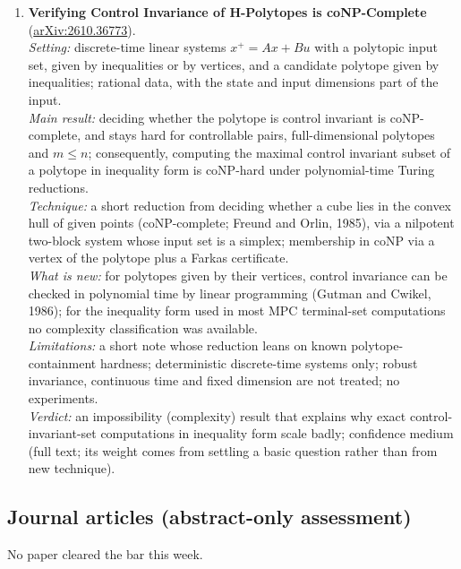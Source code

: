\documentclass[11pt,a4paper]{article}
\begin{document}
\begin{enumerate}[leftmargin=*]
  \emph{Verdict:} a fundamental limit of certainty-equivalent control when actions shape the information, with an explicit regime where its loss grows linearly in time; confidence medium (full text; scalar setting).
  \item \textbf{Verifying Control Invariance of H-Polytopes is coNP-Complete}~\cite{villanueva2026verifying} (\href{https://arxiv.org/abs/2610.36773}{arXiv:2610.36773}).\\
  \emph{Setting:} discrete-time linear systems $x^+ = Ax + Bu$ with a polytopic input set, given by inequalities or by vertices, and a candidate polytope given by inequalities; rational data, with the state and input dimensions part of the input.\\
  \emph{Main result:} deciding whether the polytope is control invariant is coNP-complete, and stays hard for controllable pairs, full-dimensional polytopes and $m \le n$; consequently, computing the maximal control invariant subset of a polytope in inequality form is coNP-hard under polynomial-time Turing reductions.\\
  \emph{Technique:} a short reduction from deciding whether a cube lies in the convex hull of given points (coNP-complete; Freund and Orlin, 1985), via a nilpotent two-block system whose input set is a simplex; membership in coNP via a vertex of the polytope plus a Farkas certificate.\\
  \emph{What is new:} for polytopes given by their vertices, control invariance can be checked in polynomial time by linear programming (Gutman and Cwikel, 1986); for the inequality form used in most \ac{MPC} terminal-set computations no complexity classification was available.\\
  \emph{Limitations:} a short note whose reduction leans on known polytope-containment hardness; deterministic discrete-time systems only; robust invariance, continuous time and fixed dimension are not treated; no experiments.\\
  \emph{Verdict:} an impossibility (complexity) result that explains why exact control-invariant-set computations in inequality form scale badly; confidence medium (full text; its weight comes from settling a basic question rather than from new technique).
\end{enumerate}

\subsection*{Journal articles (abstract-only assessment)}
No paper cleared the bar this week.
\end{document}
